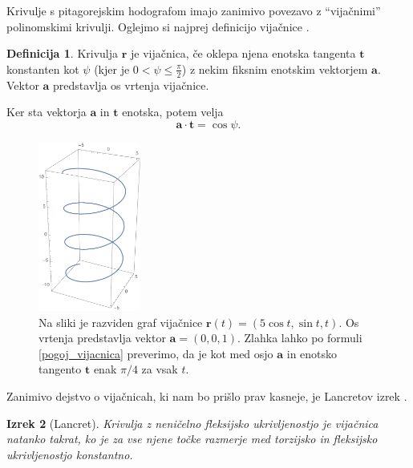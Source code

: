 \documentclass[12pt,a4paper,twoside]{article}
\theoremstyle{definition} %
\newtheorem{definicija}{Definicija}[section]
\theoremstyle{plain} %
\newtheorem{izrek}[definicija]{Izrek}
\theoremstyle{primerstyle}
\numberwithin{equation}{section}  %
\newcommand{\tV}{\mathbf{t}}
\newcommand{\aV}{\mathbf{a}}
\newcommand{\rV}{\mathbf{r}}
\begin{document}
Krivulje s pitagorejskim hodografom imajo zanimivo povezavo z ``vijačnimi'' polinomskimi krivulji. Oglejmo si najprej definicijo vijačnice \cite{kreyszig2019differential}.
\begin{definicija}
	\label{definicija_vijacnica}
	Krivulja $\rV$ je vijačnica, če oklepa njena enotska tangenta $\tV$ konstanten kot $\psi$ (kjer je $0<\psi \leq \frac{\pi}{2}$) z nekim fiksnim enotskim vektorjem $\aV.$ Vektor $\aV$ predstavlja os vrtenja vijačnice.
\end{definicija}
Ker sta vektorja $\aV$ in $\tV$ enotska, potem velja
\begin{equation}
	\label{pogoj_vijacnica}
	\aV \cdot \tV=\cos \psi.
\end{equation}
\begin{figure}[h!]
	  \centering
	  \includegraphics[width=0.3\textwidth]{images/simple_helix.pdf}
	  \caption[Primer preposte vijačnice.]{Na sliki je razviden graf vijačnice $\rV(t)=(5\cos{t},\sin{t},t).$ Os vrtenja predstavlja vektor $\aV=(0,0,1).$ Zlahka lahko po formuli \eqref{pogoj_vijacnica} preverimo, da je kot med osjo $\aV$ in enotsko tangento $\tV$ enak $\pi/4$ za vsak $t.$}
	  \label{fig:simple_helix}
	\end{figure}
Zanimivo dejstvo o vijačnicah, ki nam bo prišlo prav kasneje, je Lancretov izrek \cite{kreyszig2019differential}.
\begin{izrek}[Lancret]
	\label{lancret}
	Krivulja z neničelno fleksijsko ukrivljenostjo je vijačnica natanko takrat, ko je za vse njene točke razmerje med torzijsko in fleksijsko ukrivljenostjo konstantno.
\end{izrek}
\end{document}
